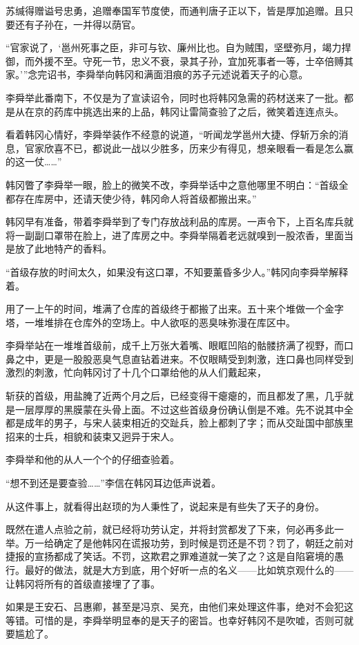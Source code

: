 苏缄得赠谥号忠勇，追赠奉国军节度使，而通判唐子正以下，皆是厚加追赠。且只要还有子孙在，一并得以荫官。

“官家说了，‘邕州死事之臣，非可与钦、廉州比也。自为贼围，坚壁弥月，竭力捍御，而外援不至。守死一节，忠义不衰，录其子孙，宜加死事者一等，士卒倍赙其家。’”念完诏书，李舜举向韩冈和满面泪痕的苏子元述说着天子的心意。

李舜举此番南下，不仅是为了宣读诏令，同时也将韩冈急需的药材送来了一批。都是从在京的药库中挑选出来的上品，韩冈让雷简查验了之后，微笑着连连点头。

看着韩冈心情好，李舜举装作不经意的说道，“听闻龙学邕州大捷、俘斩万余的消息，官家欣喜不已，都说此一战以少胜多，历来少有得见，想亲眼看一看是怎么赢的这一仗……”

韩冈瞥了李舜举一眼，脸上的微笑不改，李舜举话中之意他哪里不明白：“首级全都存在库房中，还请天使少待，韩冈命人将首级都搬出来。”

韩冈早有准备，带着李舜举到了专门存放战利品的库房。一声令下，上百名库兵就将一副副口罩带在脸上，进了库房之中。李舜举隔着老远就嗅到一股浓香，里面当是放了此地特产的香料。

“首级存放的时间太久，如果没有这口罩，不知要薰昏多少人。”韩冈向李舜举解释着。

用了一上午的时间，堆满了仓库的首级终于都搬了出来。五十来个堆做一个金字塔，一堆堆排在仓库外的空场上。中人欲呕的恶臭味弥漫在库区中。

李舜举站在一堆堆首级前，成千上万张大着嘴、眼眶凹陷的骷髅挤满了视野，而口鼻之中，更是一股股恶臭气息直钻着进来。不仅眼睛受到刺激，连口鼻也同样受到激烈的刺激，忙向韩冈讨了十几个口罩给他的从人们戴起来，

斩获的首级，用盐腌了近两个月之后，已经变得干瘪瘪的，而且都发了黑，几乎就是一层厚厚的黑膜蒙在头骨上面。不过这些首级身份确认倒是不难。先不说其中全都是成年的男子，与宋人装束相近的交趾兵，脸上都刺了字；而从交趾国中部族里招来的士兵，相貌和装束又迥异于宋人。

李舜举和他的从人一个个的仔细查验着。

“想不到还是要查验……”李信在韩冈耳边低声说着。

从这件事上，就看得出赵顼的为人秉性了，说起来是有些失了天子的身份。

既然在遣人点验之前，就已经将功劳认定，并将封赏都发了下来，何必再多此一举。万一给确定了是他韩冈在谎报功劳，到时候是罚还是不罚？罚了，朝廷之前对捷报的宣扬都成了笑话。不罚，这欺君之罪难道就一笑了之？这是自陷窘境的愚行。最好的做法，就是大方到底，用个好听一点的名义——比如筑京观什么的——让韩冈将所有的首级直接埋了了事。

如果是王安石、吕惠卿，甚至是冯京、吴充，由他们来处理这件事，绝对不会犯这等错。可惜的是，李舜举明显奉的是天子的密旨。也幸好韩冈不是吹嘘，否则可就要尴尬了。

